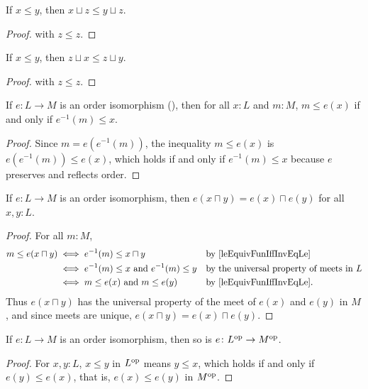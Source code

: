 \begin{corollary}
  \label{joinMonoR}
  If $x \le y$, then $x \sqcup z \le y \sqcup z$.
\end{corollary}
\begin{proof}
   with $z \le z$.
\end{proof}

\begin{corollary}
  \label{joinMonoL}
  If $x \le y$, then $z \sqcup x \le z \sqcup y$.
\end{corollary}
\begin{proof}
   with $z \le z$.
\end{proof}

\begin{lemma}
  \label{leEquivFunIffInvEqLe}
  If $e \colon L \to M$ is an order isomorphism (), then for all $x : L$ and $m : M$, $m \le e(x)$ if and only if $e^{-1}(m) \le x$.
\end{lemma}
\begin{proof}
  Since $m = e(e^{-1}(m))$, the inequality $m \le e(x)$ is $e(e^{-1}(m)) \le e(x)$, which holds if and only if $e^{-1}(m) \le x$ because $e$ preserves and reflects order.
\end{proof}

\begin{lemma}
  \label{presMeet}
  If $e \colon L \to M$ is an order isomorphism, then $e(x \sqcap y) = e(x) \sqcap e(y)$ for all $x, y : L$.
\end{lemma}
\begin{proof}
  For all $m : M$,
  \begin{align*}
    m \le e(x \sqcap y)
    & \iff e^{-1}(m) \le x \sqcap y
    && \text{by \Cref{leEquivFunIffInvEqLe}} \\
    & \iff e^{-1}(m) \le x \text{ and } e^{-1}(m) \le y
    && \text{by the universal property of meets in $L$} \\
    & \iff m \le e(x) \text{ and } m \le e(y)
    && \text{by \Cref{leEquivFunIffInvEqLe}.}
  \end{align*}
  Thus $e(x \sqcap y)$ has the universal property of the meet of $e(x)$ and $e(y)$ in $M$, and since meets are unique, $e(x \sqcap y) = e(x) \sqcap e(y)$.
\end{proof}

\begin{lemma}
  \label{DualPseudolatticeEquiv}
  If $e \colon L \to M$ is an order isomorphism, then so is $e \colon L^{\mathrm{op}} \to M^{\mathrm{op}}$.
\end{lemma}
\begin{proof}
  For $x, y : L$, $x \le y$ in $L^{\mathrm{op}}$ means $y \le x$, which holds if and only if $e(y) \le e(x)$, that is, $e(x) \le e(y)$ in $M^{\mathrm{op}}$.
\end{proof}

